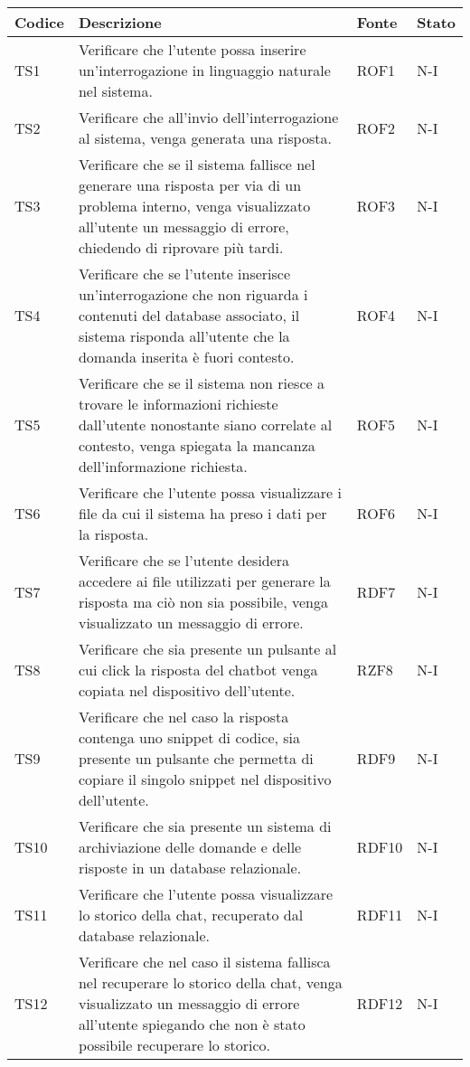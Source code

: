 \begin{table}[h!]
    \centering
    \renewcommand{\arraystretch}{1.5}
    \begin{tabularx}{\textwidth}{|p{}|X|p{}|p{}|}\hline
    \rowcolor[HTML]{FFD700}
    \textbf{Codice} & \textbf{Descrizione} & \textbf{Fonte} & \textbf{Stato} \\ \hline
    TS1 & Verificare che l'utente possa inserire un'interrogazione in linguaggio naturale 
    nel sistema. & ROF1 & N-I \\ \hline
    TS2 & Verificare che all'invio dell'interrogazione al sistema, venga generata una risposta. & ROF2 & N-I \\ \hline
    TS3 & Verificare che se il sistema fallisce nel generare una risposta per via di un problema interno, venga visualizzato all'utente un messaggio di errore, chiedendo di riprovare più tardi. & ROF3 & N-I \\ \hline
    TS4 & Verificare che se l'utente inserisce un'interrogazione che non riguarda i contenuti del database associato, il sistema risponda all'utente che la domanda inserita è fuori contesto. & ROF4 & N-I \\ \hline
    TS5 & Verificare che se il sistema non riesce a trovare le informazioni richieste dall'utente nonostante siano correlate al contesto, venga spiegata la mancanza dell'informazione richiesta. & ROF5 & N-I \\ \hline
    TS6 & Verificare che l'utente possa visualizzare i file da cui il sistema ha preso i dati per la risposta. & ROF6 & N-I \\ \hline
    TS7 & Verificare che se l'utente desidera accedere ai file utilizzati per generare la risposta ma ciò non sia possibile, venga visualizzato un messaggio di errore. & RDF7 & N-I \\ \hline
    TS8 & Verificare che sia presente un pulsante al cui click la risposta del chatbot venga copiata nel dispositivo dell'utente. & RZF8 & N-I \\ \hline
    TS9 & Verificare che nel caso la risposta contenga uno snippet di codice, sia presente un pulsante che permetta di copiare il singolo snippet nel dispositivo dell'utente. & RDF9 & N-I \\ \hline
    TS10 & Verificare che sia presente un sistema di archiviazione delle domande e delle risposte in un database relazionale. & RDF10 & N-I \\ \hline
    TS11 & Verificare che l'utente possa visualizzare lo storico della chat, recuperato dal database relazionale. & RDF11 & N-I \\ \hline
    TS12 & Verificare che nel caso il sistema fallisca nel recuperare lo storico della chat, venga visualizzato un messaggio di errore all'utente spiegando che non è stato possibile recuperare lo storico. & RDF12 & N-I \\ \hline
   \end{tabularx}
\end{table}

